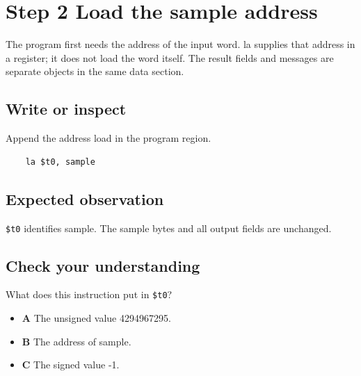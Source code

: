 \section{Step 2 Load the sample
  address}\label{004-bit-inspector-s02-step-2-load-the-sample-address}

The program first needs the address of the input word. la supplies that
address in a register; it does not load the word itself. The result
fields and messages are separate objects in the same data section.

\subsection{Write or
  inspect}\label{004-bit-inspector-s02-write-or-inspect}

Append the address load in the program region.

\begin{verbatim}
    la $t0, sample
\end{verbatim}

\subsection{Expected
  observation}\label{004-bit-inspector-s02-expected-observation}

\texttt{\$t0} identifies sample. The sample bytes and all output fields
are unchanged.

\subsection{Check your
  understanding}\label{004-bit-inspector-s02-check-your-understanding}

What does this instruction put in \texttt{\$t0}?

\begin{itemize}
  \tightlist
  \item
        \textbf{A} The unsigned value 4294967295.
  \item
        \textbf{B} The address of sample.
  \item
        \textbf{C} The signed value -1.
\end{itemize}
